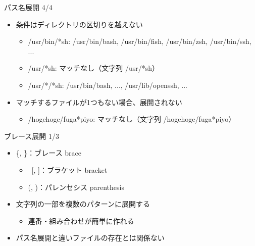 \documentclass[12pt,aspectratio=169]{beamer}
\begin{document}
\begin{frame}{パス名展開 4/4}

  \begin{itemize}
    \item 条件はディレクトリの区切りを越えない
      \begin{itemize}
        \item /usr/bin/*sh: /usr/bin/bash, /usr/bin/fish, /usr/bin/zsh, /usr/bin/ssh, ...
        \item /usr/*sh: マッチなし（文字列 /usr/*sh）
        \item /usr/*/*sh: /usr/bin/bash, ..., /usr/lib/openssh, ...
      \end{itemize}

    \item マッチするファイルが1つもない場合、展開されない
      \begin{itemize}
        \item /hogehoge/fuga*piyo: マッチなし（文字列 /hogehoge/fuga*piyo）
      \end{itemize}

  \end{itemize}

\end{frame}


\begin{frame}{ブレース展開 1/3}

  \begin{itemize}
    \item \{, \}：ブレース brace
      \begin{itemize}
        \item\ [, ]：ブラケット bracket
        \item (, )：パレンセシス parenthesis
      \end{itemize}

    \item 文字列の一部を複数のパターンに展開する
      \begin{itemize}
        \item 連番・組み合わせが簡単に作れる
      \end{itemize}
    \item パス名展開と違いファイルの存在とは関係ない

  \end{itemize}

\end{frame}
\end{document}
